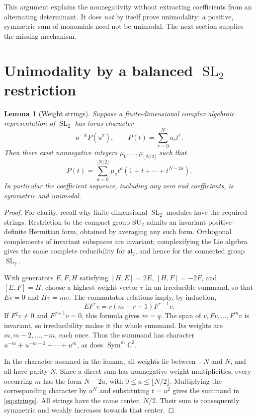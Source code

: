 \documentclass[11pt,a4paper]{article}
\newtheorem{lemma}[theorem]{Lemma}
\theoremstyle{definition}
\theoremstyle{remark}
\newcommand{\C}{\mathbb C}
\newcommand{\SL}{\operatorname{SL}}
\newcommand{\Sym}{\operatorname{Sym}}
\numberwithin{equation}{section}
\begin{document}
This argument explains the nonnegativity without extracting coefficients
from an alternating determinant. It does \emph{not} by itself prove
unimodality: a positive, symmetric sum of monomials need not be unimodal.
The next section supplies the missing mechanism.

\section{Unimodality by a balanced \texorpdfstring{$\SL_2$}{SL2} restriction}
\label{sec:unimodal}
\begin{lemma}[Weight strings]
\label{lem:sl2}
Suppose a finite-dimensional complex algebraic representation of
\(\SL_2\) has torus character
\[
 u^{-N}P(u^2),\qquad P(t)=\sum_{r=0}^{N}a_rt^r.
\]
Then there exist nonnegative integers \(\mu_0,\ldots,
\mu_{\lfloor N/2\rfloor}\) such that
\begin{equation}
 P(t)=\sum_{a=0}^{\lfloor N/2\rfloor}
 \mu_a t^a(1+t+\cdots+t^{N-2a}).
 \label{eq:strings}
\end{equation}
In particular the coefficient sequence, including any zero end coefficients,
is symmetric and unimodal.
\end{lemma}
\begin{proof}
For clarity, recall why finite-dimensional \(\SL_2\) modules have the
required strings. Restriction to the compact group \(\mathrm{SU}_2\)
admits an invariant positive-definite Hermitian form, obtained by averaging
any such form. Orthogonal complements of invariant subspaces are invariant;
complexifying the Lie algebra gives the same complete reducibility for
\(\mathfrak{sl}_2\), and hence for the connected group \(\SL_2\).

With generators \(E,F,H\) satisfying
\([H,E]=2E\), \([H,F]=-2F\), and \([E,F]=H\), choose a highest-weight
vector \(v\) in an irreducible summand, so that \(Ev=0\) and \(Hv=mv\).
The commutator relations imply, by induction,
\[
 EF^rv=r(m-r+1)F^{r-1}v.
\]
If \(F^qv\ne0\) and \(F^{q+1}v=0\), this formula gives \(m=q\).
The span of \(v,Fv,\ldots,F^mv\) is invariant, so irreducibility makes
it the whole summand. Its weights are \(m,m-2,\ldots,-m\), each once.
Thus the summand has character
\(u^{-m}+u^{-m+2}+\cdots+u^m\), as does \(\Sym^m\C^2\).

In the character assumed in the lemma, all weights lie between \(-N\)
and \(N\), and all have parity \(N\). Since a direct sum has nonnegative
weight multiplicities, every occurring \(m\) has the form \(N-2a\), with
\(0\le a\le\lfloor N/2\rfloor\). Multiplying the corresponding character
by \(u^N\) and substituting \(t=u^2\) gives the summand in
\eqref{eq:strings}. All strings have the same center, \(N/2\). Their sum
is consequently symmetric and weakly increases towards that center.
\end{proof}
\end{document}

